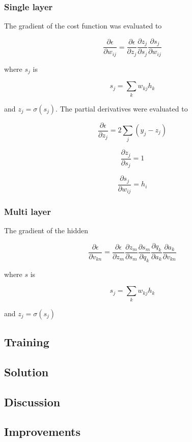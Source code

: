 \documentclass{IEEEtran}
\begin{document}
\subsubsection{Single layer}

The gradient of the cost function was evaluated to

\begin{equation}
  \frac{\partial \epsilon}{\partial w_{ij}} =
  \frac{\partial \epsilon}{\partial z_j}
  \frac{\partial z_j}{\partial s_j}
  \frac{\partial s_j}{\partial w_{ij}}
\end{equation}

where $s_j$ is

\begin{equation}
  s_j = \sum_{k}{w_{kj}h_k}
\end{equation}

and $z_j = \sigma(s_j)$. The partial derivatives were evaluated to

\begin{equation}
    \frac{\partial \epsilon}{\partial z_j} = 2\sum_j(y_j - z_j)
\end{equation}

\begin{equation}
    \frac{\partial z_j}{\partial s_j} = 1
\end{equation}

\begin{equation}
    \frac{\partial s_j}{\partial w_{ij}} = h_i
\end{equation}

\subsubsection{Multi layer}

The gradient of the hidden

\begin{equation}
  \frac{\partial \epsilon}{\partial v_{kn}} =
  \frac{\partial \epsilon}{\partial z_m}
  \frac{\partial z_m}{\partial s_m}
  \frac{\partial s_m}{\partial q_k}
  \frac{\partial q_k}{\partial a_k}
  \frac{\partial a_k}{\partial v_{kn}}
\end{equation}

where $s$ is

\begin{equation}
  s_j = \sum_{k}{w_{kj}h_k}
\end{equation}

and $z_j = \sigma(s_j)$

\subsection{Training}

\subsection{Solution}

\subsection{Discussion}

\subsection{Improvements}
\end{document}
